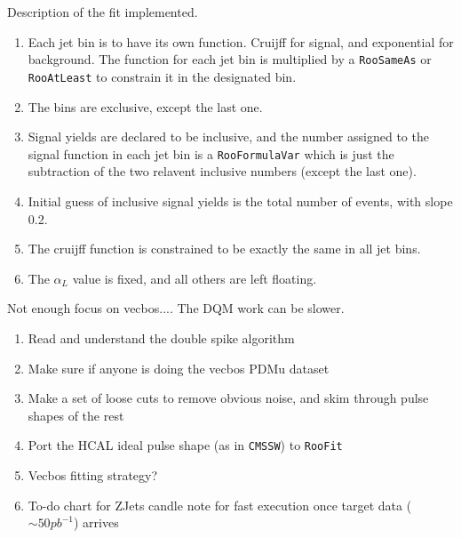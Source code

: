 Description of the fit implemented.

\begin{enumerate}
\item Each jet bin is to have its own function.  Cruijff for signal, and exponential for background.  The function for each jet bin is multiplied by a \texttt{RooSameAs} or \texttt{RooAtLeast}
to constrain it in the designated bin.
\item The bins are exclusive, except the last one.
\item Signal yields are declared to be inclusive, and the number assigned to the signal function in each jet bin is a \texttt{RooFormulaVar} which is just the subtraction
of the two relavent inclusive numbers (except the last one).
\item Initial guess of inclusive signal yields is the total number of events, with slope 0.2.
\item The cruijff function is constrained to be exactly the same in all jet bins.
\item The $\alpha_L$ value is fixed, and all others are left floating.
\end{enumerate}


Not enough focus on vecbos....  The DQM work can be slower.



\begin{enumerate}
\item Read and understand the double spike algorithm
\item Make sure if anyone is doing the vecbos PDMu dataset
\item Make a set of loose cuts to remove obvious noise, and skim through pulse shapes of the rest
\item Port the HCAL ideal pulse shape (as in \texttt{CMSSW}) to \texttt{RooFit}
\item Vecbos fitting strategy?
\item To-do chart for ZJets candle note for fast execution once target data ($\sim 50 pb^{-1}$) arrives
\end{enumerate}


